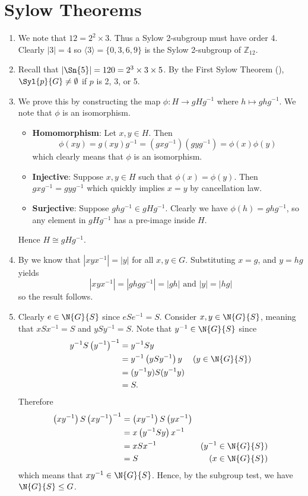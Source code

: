 \section{Sylow Theorems}
\begin{enumerate}
    \item We note that $12 = 2^2 \times 3$. Thus a Sylow 2-subgroup must have order 4. Clearly $|3| = 4$ so $\langle 3 \rangle = \{0, 3, 6, 9\}$ is the Sylow 2-subgroup of $\mathbb{Z}_{12}$.

    \item Recall that $|\Sn{5}| = 120 = 2^3 \times 3 \times 5$. By the First Sylow Theorem (), $\Syl{p}{G} \neq \emptyset$ if $p$ is 2, 3, or 5.

    \item We prove this by constructing the map $\phi: H \to gHg^{-1}$ where $h \mapsto ghg^{-1}$. We note that $\phi$ is an isomorphism.
    \begin{itemize}
        \item \textbf{Homomorphism}: Let $x, y \in H$. Then
        \[
            \phi(xy) = g(xy)g^{-1} = (gxg^{-1})(gyg^{-1}) = \phi(x)\phi(y)
        \]
        which clearly means that $\phi$ is an isomorphism.
        \item \textbf{Injective}: Suppose $x, y \in H$ such that $\phi(x) = \phi(y)$. Then $gxg^{-1} = gyg^{-1}$ which quickly implies $x = y$ by cancellation law.
        \item \textbf{Surjective}: Suppose $ghg^{-1} \in gHg^{-1}$. Clearly we have $\phi(h) = ghg^{-1}$, so any element in $gHg^{-1}$ has a pre-image inside $H$.
    \end{itemize}
    Hence $H \cong gHg^{-1}$.

    \item By  we know that $|xyx^{-1}| = |y|$ for all $x, y \in G$. Substituting $x = g$, and $y = hg$ yields
    \[
        |xyx^{-1}| = |gh gg^{-1}| = |gh| \text{ and } |y| = |hg|
    \]
    so the result follows.

    \item Clearly $e \in \N{G}{S}$ since $eSe^{-1} = S$. Consider $x, y \in \N{G}{S}$, meaning that $xSx^{-1} = S$ and $ySy^{-1} = S$. Note that $y^{-1} \in \N{G}{S}$ since
    \begin{align*}
        y^{-1}S\left(y^{-1}\right)^{-1} &= y^{-1}Sy\\
        &= y^{-1}\left(ySy^{-1}\right)y & (y \in \N{G}{S})\\
        &= (y^{-1}y)S(y^{-1}y)\\
        &= S.
    \end{align*}
    Therefore
    \begin{align*}
        \left(xy^{-1}\right)S\left(xy^{-1}\right)^{-1} &= \left(xy^{-1}\right)S\left(yx^{-1}\right)\\
        &= x\left(y^{-1}Sy\right)x^{-1}\\
        &= xSx^{-1} & (y^{-1} \in \N{G}{S})\\
        &= S & (x \in \N{G}{S})
    \end{align*}
    which means that $xy^{-1} \in \N{G}{S}$. Hence, by the subgroup test, we have $\N{G}{S} \leq G$.


\end{enumerate}

